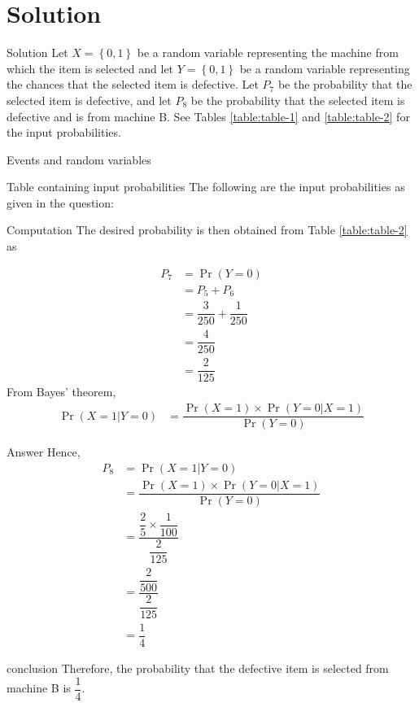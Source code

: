 \documentclass{beamer}
\providecommand{\pr}[1]{\ensuremath{\Pr\left(#1\right)}}
\providecommand{\cbrak}[1]{\ensuremath{\left\{#1\right\}}}
\begin{document}
	\section{Solution}
	\begin{frame}{Solution}
	 Let $X=\cbrak{0,1}$ be a random variable representing the machine from which the item is selected and let $Y=\cbrak{0,1}$ be a random variable representing the chances that the selected item is defective. Let $P_7$ be the probability that the selected item is defective, and let $P_8$ be the probability that the selected item is defective and is from machine B. See Tables 
	\eqref{table:table-1}
	and 
	\eqref{table:table-2} for the input probabilities.
	 	\end{frame}
	 \begin{frame}{Events and random variables}
	\begin{table}[ht!]
		
		\vspace*{5pt}
		\caption{}
		\label{table:table-1}
	\end{table}
	\end{frame}
	\begin{frame}{Table containing input probabilities}
		The following are the input probabilities as given in the question:
		\begin{table}[ht!]
			\centering
			
			\caption{Input probabilities}
			\label{table:table2}	
		\end{table}
	\end{frame}
	\begin{frame}{Computation}
		The desired probability is then obtained from Table \eqref{table:table-2} as
	
	\begin{align}
		P_7 &=\pr{Y=0}\\
		    &=P_5+P_6 \\		
		    &= \dfrac{3}{250}+ \dfrac{1}{250}\\
		    &= \dfrac{4}{250}\\
	     	&= \dfrac{2}{125}
	\end{align}
From Bayes' theorem, 
\begin{align}
\pr{X=1|Y=0}
&=\dfrac{\pr{X=1}\times\pr{Y=0|X=1}}{\pr{Y=0}}
\end{align}

	\end{frame}
	
	\begin{frame}{Answer}
Hence,
\begin{align}
	P_8 &=\pr{X=1|Y=0} \\
	&=\dfrac{\pr{X=1}\times\pr{Y=0|X=1}}{\pr{Y=0}}\\
	&= \dfrac{\dfrac{2}{5}\times\dfrac{1}{100}}{\dfrac{2}{125}}\\
	&= \dfrac{\dfrac{2}{500}}{\dfrac{2}{125}}\\
	&=\dfrac{1}{4}
	\end{align}
	\end{frame}
	\begin{frame}{conclusion}
	Therefore, the probability that the defective item is selected from machine B is $\dfrac{1}{4}$.
	\end{frame}
\end{document}
